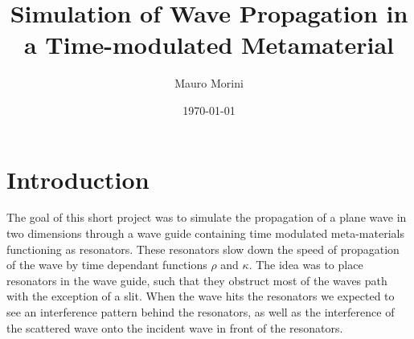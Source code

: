 \documentclass{article}
\title{Simulation of Wave Propagation in a Time-modulated Metamaterial}
\author{Mauro Morini}
\date{\today}
\begin{document}
\maketitle
\tableofcontents
\newpage
\section{Introduction}
The goal of this short project was to simulate the propagation of a plane wave in two dimensions through a wave guide containing time modulated meta-materials functioning as resonators. These resonators slow down the speed of propagation of the wave by time dependant functions $\rho$ and $\kappa$. The idea was to place resonators in the wave guide, such that they obstruct most of the waves path with the exception of a slit. When the wave hits the resonators we expected to see an interference pattern behind the resonators, as well as the interference of the scattered wave onto the incident wave in front of the resonators.
\end{document}
